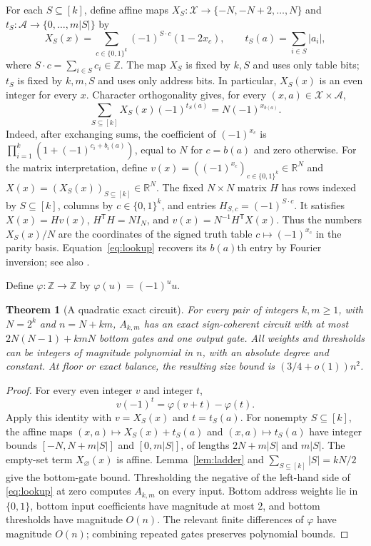 \documentclass[11pt]{article}
\newtheorem{theorem}{Theorem}[section]
\newcommand{\bits}{\{0,1\}}
\begin{document}
For each $S\subseteq[k]$, define affine maps
$X_S:\mathcal X\to\{-N,-N+2,\ldots,N\}$ and
$t_S:\mathcal A\to\{0,\ldots,m|S|\}$ by
$$
X_S(x)=\sum_{c\in\bits^k}(-1)^{S\cdot c}(1-2x_c),\qquad
t_S(a)=\sum_{i\in S}|a_i|,
$$
where $S\cdot c=\sum_{i\in S}c_i\in\mathbb Z$.
The map $X_S$ is fixed by $k,S$ and uses only table bits;
$t_S$ is fixed by $k,m,S$ and uses only address bits. In particular, $X_S(x)$ is an even integer for every $x$.
Character orthogonality gives, for every $(x,a)\in\mathcal X\times\mathcal A$,
\begin{equation}\label{eq:lookup}
\sum_{S\subseteq[k]}X_S(x)(-1)^{t_S(a)}=N(-1)^{x_{b(a)}}.
\end{equation}
Indeed, after exchanging sums, the coefficient of $(-1)^{x_c}$ is
$\prod_{i=1}^k(1+(-1)^{c_i+b_i(a)})$, equal to $N$ for $c=b(a)$ and
zero otherwise. For the matrix interpretation, define
$v(x)=((-1)^{x_c})_{c\in\bits^k}\in\mathbb R^N$ and
$X(x)=(X_S(x))_{S\subseteq[k]}\in\mathbb R^N$.
The fixed $N\times N$ matrix $H$ has rows indexed by $S\subseteq[k]$,
columns by $c\in\bits^k$, and entries $H_{S,c}=(-1)^{S\cdot c}$. It satisfies
$X(x)=Hv(x)$, $H^{\mathsf T}H=NI_N$, and
$v(x)=N^{-1}H^{\mathsf T}X(x)$.
Thus the numbers $X_S(x)/N$ are the coordinates of the signed truth
table $c\mapsto(-1)^{x_c}$ in the parity basis.
Equation~\eqref{eq:lookup} recovers its $b(a)$th entry by Fourier
inversion; see also \cite[Chapter~1]{OD}.

Define $\varphi:\mathbb Z\to\mathbb Z$ by $\varphi(u)=(-1)^u u$.

\begin{theorem}[A quadratic exact circuit]\label{thm:simple}
For every pair of integers $k,m\ge1$, with $N=2^k$ and $n=N+km$,
$A_{k,m}$ has an exact sign-coherent circuit with at most
$2N(N-1)+kmN$ bottom gates and one output gate.
All weights and thresholds can be integers of magnitude polynomial
in $n$, with an absolute degree and constant.
At floor or exact balance, the resulting size bound is $(3/4+o(1))n^2$.
\end{theorem}
\begin{proof}
For every even integer $v$ and integer $t$,
$$v(-1)^t=\varphi(v+t)-\varphi(t).$$
Apply this identity with $v=X_S(x)$ and $t=t_S(a)$.
For nonempty $S\subseteq[k]$, the affine maps
$(x,a)\mapsto X_S(x)+t_S(a)$ and $(x,a)\mapsto t_S(a)$ have integer
bounds $[-N,N+m|S|]$ and $[0,m|S|]$, of lengths
$2N+m|S|$ and $m|S|$. The empty-set term $X_\varnothing(x)$ is affine.
Lemma~\ref{lem:ladder} and $\sum_{S\subseteq[k]}|S|=kN/2$ give the
bottom-gate bound. Thresholding the negative of the left-hand side of
\eqref{eq:lookup} at zero computes $A_{k,m}$ on every input.
Bottom address weights lie in $\{0,1\}$, bottom input coefficients
have magnitude at most $2$, and bottom thresholds have magnitude $O(n)$.
The relevant finite differences of $\varphi$ have magnitude $O(n)$;
combining repeated gates preserves polynomial bounds.
\end{proof}
\end{document}
